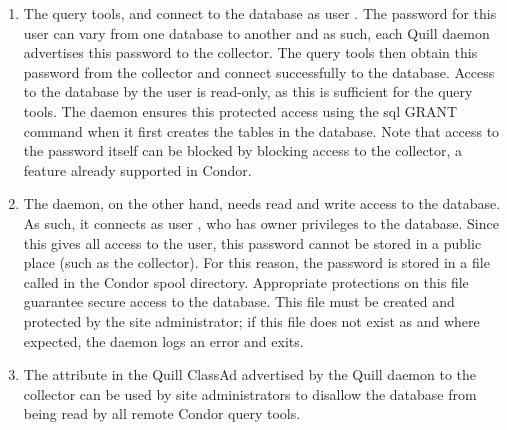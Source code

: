 \begin{enumerate}
\item The query tools,  and
 connect to the database as user .
The password for this user can vary from one database to another and
as such, each Quill daemon advertises this password to the collector.
The query tools then obtain this password from the collector and
connect successfully to the database.  Access to the database by the
 user is read-only, as this is sufficient for the
query tools.  The  daemon ensures this protected access using the sql
GRANT command when it first creates the tables in the database.  Note that
access to the  password itself can be blocked by
blocking access to the collector, a feature already supported in Condor.

\item The  daemon, on the other hand, needs read and write access
to the database.  As such, it connects as user ,
who has owner privileges to the database.  Since this gives all
access to the  user, this password cannot
be stored in a public place (such as the collector).  For this
reason, the  password is stored in a file called
 in the Condor spool directory.
Appropriate protections on this file guarantee secure access to the database.
This file must be created and protected by the site administrator;
if this file does not exist as and where expected, the 
daemon logs an error and exits.

\item The  attribute in the Quill ClassAd advertised
by the Quill daemon to the collector can be used by site administrators
to disallow the database from being read by all remote Condor query tools.

\end{enumerate}

